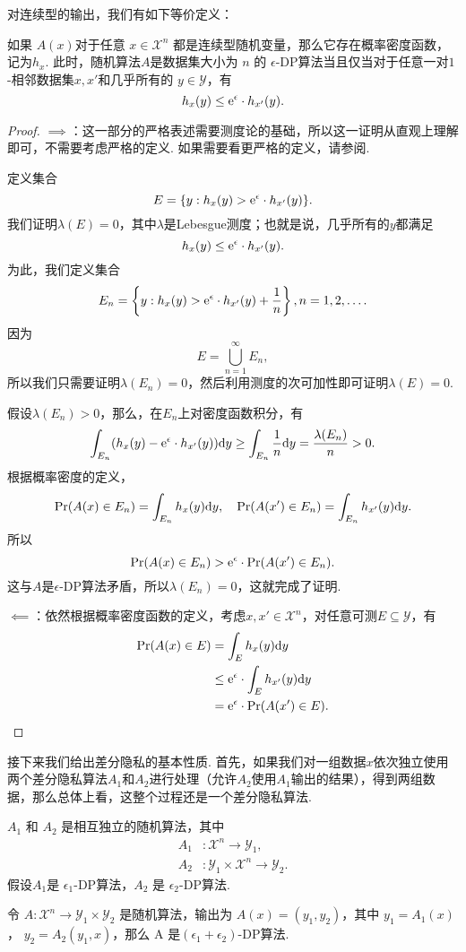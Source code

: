 对连续型的输出，我们有如下等价定义：
\begin{proposition}\label{prop:continuous-dp}
如果 $A(x)$对于任意 $x \in \mathcal X^n$ 都是连续型随机变量，那么它存在概率密度函数，记为$h_{x}$. 此时，随机算法$A$是数据集大小为 $n$ 的 $\epsilon$-DP算法当且仅当对于任意一对$1$-相邻数据集$x, x'$和几乎所有的 $y \in \mathcal Y$，有
    \[
    h_{x}(y) \leq \mathrm{e}^{\epsilon} \cdot h_{x'}(y).
    \]
\end{proposition}
\begin{proof}
$\implies$：这一部分的严格表述需要测度论的基础，所以这一证明从直观上理解即可，不需要考虑严格的定义. 如果需要看更严格的定义，请参阅.

定义集合
\[E=\{y:h_x(y)>\mathrm{e}^\epsilon\cdot h_{x'}(y)\}.\]
我们证明$\lambda(E)=0$，其中$\lambda$是Lebesgue测度；也就是说，几乎所有的$y$都满足
\[h_x(y)\leq\mathrm{e}^\epsilon\cdot h_{x'}(y).\]
为此，我们定义集合
\[E_n=\left\{y:h_x(y)>\mathrm{e}^\epsilon\cdot h_{x'}(y)+\frac{1}{n}\right\}, n=1,2,\dots.\]
因为
\[E=\bigcup_{n=1}^\infty E_n,\]
所以我们只需要证明$\lambda(E_n)=0$，然后利用测度的次可加性即可证明$\lambda(E)=0$.

假设$\lambda(E_n)>0$，那么，在$E_n$上对密度函数积分，有
\[\int_{E_n}(h_x(y)-\mathrm{e}^\epsilon\cdot h_{x'}(y))\mathrm{d} y\geq \int_{E_n}\frac{1}{n}\mathrm{d} y=\frac{\lambda(E_n)}{n}>0.\]
根据概率密度的定义，
\[\Pr(A(x)\in E_n)=\int_{E_n}h_x(y)\mathrm{d} y,\quad\Pr(A(x')\in E_n)=\int_{E_n}h_{x'}(y)\mathrm{d} y.\]
所以
\[\Pr(A(x)\in E_n)>\mathrm{e}^\epsilon\cdot\Pr(A(x')\in E_n).\]
这与$A$是$\epsilon$-DP算法矛盾，所以$\lambda(E_n)=0$，这就完成了证明.

$\impliedby$：依然根据概率密度函数的定义，考虑$x,x'\in\mathcal X^n$，对任意可测$E\subseteq\mathcal Y$，有
\begin{align*}
\Pr(A(x)\in E) &= \int_E h_x(y)\mathrm{d} y \\
&\leq \mathrm{e}^\epsilon\cdot\int_E h_{x'}(y)\mathrm{d} y \\
&= \mathrm{e}^\epsilon\cdot\Pr(A(x')\in E).
\end{align*}
\end{proof}

接下来我们给出差分隐私的基本性质. 首先，如果我们对一组数据$x$依次独立使用两个差分隐私算法$A_1$和$A_2$进行处理（允许$A_2$使用$A_1$输出的结果），得到两组数据，那么总体上看，这整个过程还是一个差分隐私算法. 

\begin{proposition}\label{prop:composition}
    $A_1$ 和 $A_2$ 是相互独立的随机算法，其中 
    \begin{align*}
        A_1&: \mathcal X^n \to \mathcal Y_1,\\
        A_2&: \mathcal Y_1 \times \mathcal X^n \to \mathcal Y_2.
    \end{align*}
    假设$A_1$是 $\epsilon_1$-DP算法，$A_2$ 是 $\epsilon_2$-DP算法.
    
    令 $A :\mathcal X^n \to \mathcal Y_1 \times \mathcal Y_2$ 是随机算法，输出为 $A(x) = (y_1, y_2)$，其中 $y_1 = A_1(x)$， $y_2 = A_2(y_1, x)$，那么 A 是$(\epsilon_1 + \epsilon_2)$-DP算法.
\end{proposition}

